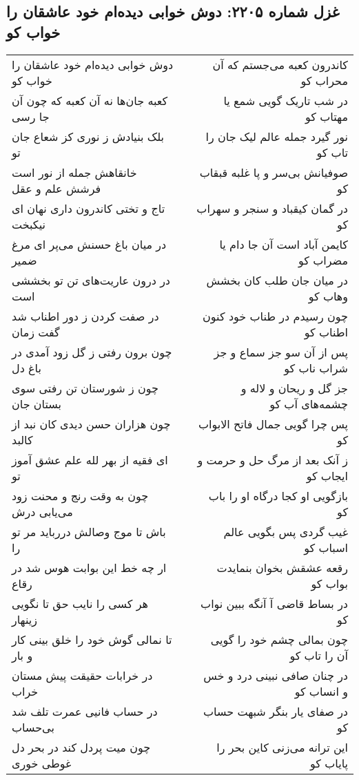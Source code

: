 \begin{center}
\section*{غزل شماره ۲۲۰۵: دوش خوابی دیده‌ام خود عاشقان را خواب کو}
\label{sec:2205}
\begin{longtable}{l p{0.5cm} r}
دوش خوابی دیده‌ام خود عاشقان را خواب کو
&&
کاندرون کعبه می‌جستم که آن محراب کو
\\
کعبه جان‌ها نه آن کعبه که چون آن جا رسی
&&
در شب تاریک گویی شمع یا مهتاب کو
\\
بلک بنیادش ز نوری کز شعاع جان تو
&&
نور گیرد جمله عالم لیک جان را تاب کو
\\
خانقاهش جمله از نور است فرشش علم و عقل
&&
صوفیانش بی‌سر و پا غلبه قبقاب کو
\\
تاج و تختی کاندرون داری نهان ای نیکبخت
&&
در گمان کیقباد و سنجر و سهراب کو
\\
در میان باغ حسنش می‌پر ای مرغ ضمیر
&&
کایمن آباد است آن جا دام یا مضراب کو
\\
در درون عاریت‌های تن تو بخششی است
&&
در میان جان طلب کان بخشش وهاب کو
\\
در صفت کردن ز دور اطناب شد گفت زمان
&&
چون رسیدم در طناب خود کنون اطناب کو
\\
چون برون رفتی ز گل زود آمدی در باغ دل
&&
پس از آن سو جز سماع و جز شراب ناب کو
\\
چون ز شورستان تن رفتی سوی بستان جان
&&
جز گل و ریحان و لاله و چشمه‌های آب کو
\\
چون هزاران حسن دیدی کان نبد از کالبد
&&
پس چرا گویی جمال فاتح الابواب کو
\\
ای فقیه از بهر لله علم عشق آموز تو
&&
ز آنک بعد از مرگ حل و حرمت و ایجاب کو
\\
چون به وقت رنج و محنت زود می‌یابی درش
&&
بازگویی او کجا درگاه او را باب کو
\\
باش تا موج وصالش دررباید مر تو را
&&
غیب گردی پس بگویی عالم اسباب کو
\\
ار چه خط این بوابت هوس شد در رقاع
&&
رقعه عشقش بخوان بنمایدت بواب کو
\\
هر کسی را نایب حق تا نگویی زینهار
&&
در بساط قاضی آ آنگه ببین نواب کو
\\
تا نمالی گوش خود را خلق بینی کار و بار
&&
چون بمالی چشم خود را گویی آن را تاب کو
\\
در خرابات حقیقت پیش مستان خراب
&&
در چنان صافی نبینی درد و خس و انساب کو
\\
در حساب فانیی عمرت تلف شد بی‌حساب
&&
در صفای یار بنگر شبهت حساب کو
\\
چون میت پردل کند در بحر دل غوطی خوری
&&
این ترانه می‌زنی کاین بحر را پایاب کو
\\
\end{longtable}
\end{center}
